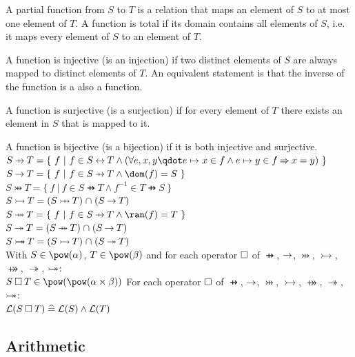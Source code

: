 \begin{rodinrefentry}
  \rrdesc
  A partial function from $S$ to $T$ is a relation that maps an element of $S$ to at most one element
  of $T$. A function is total if its domain contains all elements of $S$, i.e. it maps every element
  of $S$ to an element of $T$.

  A function is injective (is an injection) if two distinct elements of $S$ are always mapped to distinct
  elements of $T$. An equivalent statement is that the inverse of the function is a also a function.

  A function is surjective (is a surjection) if for every element of $T$ there exists an element in $S$
  that is mapped to it.

  A function is bijective (is a bijection) if it is both injective and surjective.
  \rrdef
  $S \pfun T = \{~ f ~|~ f\in S\rel T \land (\forall e,x,y \qdot e\mapsto x\in f \land e\mapsto y\in f \limp x=y) ~\}$\\
  $S \tfun T = \{~ f ~|~ f\in S\pfun T \land \dom(f) = S ~\}$\\
  $S \pinj T = \{~ f ~|~ f\in S\pfun T \land f^{-1} \in  T\pfun S ~\}$\\
  $S \tinj T = (S\pinj T) \binter (S\tfun T)$\\
  $S \psur T = \{~ f ~|~ f\in S\pfun T \land \ran(f) = T ~\}$\\
  $S \tsur T = (S\psur T) \binter (S\tfun T)$\\
  $S \mathbin{ \rightarrowtail \mkern-18mu\twoheadrightarrow} T = (S\mathbin\rightarrowtail T) \mathbin{\mkern1mu\cap\mkern1mu} (S\mathbin\twoheadrightarrow T)$\\
  \rrtypes
  With $S\in\pow(\alpha)$, $T\in\pow(\beta)$ and for each operator $\mathbin{\Box}$ of $\pfun$, $\mathbin\rightarrow$, $\pinj$, $\tinj$, $\psur$, $\tsur$, $\mathbin{ \rightarrowtail \mkern-18mu\twoheadrightarrow}$:\\
  $S \opelipse T \in \pow(\pow(\alpha\cprod\beta))$
  \rrwd
  For each operator $\mathbin{\Box}$ of $\pfun$, $\mathbin\rightarrow$, $\pinj$, $\tinj$, $\psur$, $\tsur$, $\mathbin{ \rightarrowtail \mkern-18mu\twoheadrightarrow}$:\\
  $\mathcal{L}(S\mathbin{\Box} T) \mathrel{\widehat=} \mathcal{L}(S) \land \mathcal{L}(T)$
\end{rodinrefentry}


\subsection{Arithmetic}

